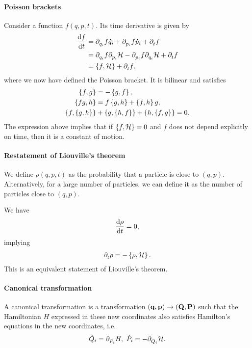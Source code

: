 \paragraph{Poisson brackets}
Consider a function $f(q, p, t)$. Its time derivative is given by
\begin{align*}
	\dv{f}{t} &= \partial^{}_{q_{i}}f\dot{q}_{i} + \partial^{}_{p_{i}}f\dot{p}_{i} + \partial^{}_{t}f \\
	          &= \partial^{}_{q_{i}}f\partial^{}_{p_{i}}\mathcal{H} - \partial^{}_{p_{i}}f\partial^{}_{q_{i}}\mathcal{H} + \partial^{}_{t}f \\
	          &= \left\{f, \mathcal{H}\right\} + \partial^{}_{t}f,
\end{align*}
where we now have defined the Poisson bracket. It is bilinear and satisfies
\begin{align*}
	\left\{f, g\right\}          &= -\left\{g, f\right\}, \\
	\left\{fg, h\right\}         &= f\left\{g, h\right\} + \left\{f, h\right\}g, \\
	\left\{f, \left\{g, h\right\}\right\} &+ \left\{g, \left\{h, f\right\}\right\} + \left\{h, \left\{f, g\right\}\right\} = 0.
\end{align*}
The expression above implies that if $\left\{f, \mathcal{H}\right\} = 0$ and $f$ does not depend explicitly on time, then it is a constant of motion.

\paragraph{Restatement of Liouville's theorem}
We define $\rho(q, p, t)$ as the probability that a particle is close to $(q, p)$. Alternatively, for a large number of particles, we can define it as the number of particles close to $(q, p)$.

We have
\begin{align*}
	\dv{\rho}{t} = 0,
\end{align*}
implying
\begin{align*}
	\partial^{}_{t}\rho = -\left\{\rho, \mathcal{H}\right\}.
\end{align*}
This is an equivalent statement of Liouville's theorem.

\paragraph{Canonical transformation}
A canonical transformation is a transformation $(\vb{q}, \vb{p})\to (\vb{Q}, \vb{P})$ such that the Hamiltonian $H$ expressed in these new coordinates also satisfies Hamilton's equations in the new coordinates, i.e.
\begin{align*}
	\dot{Q}_{i} = \partial^{}_{P_{i}}H,\ \dot{P}_{i} = -\partial^{}_{Q_{i}}\mathcal{H}.
\end{align*}

